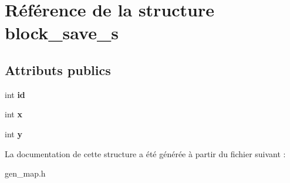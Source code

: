 \hypertarget{structblock__save__s}{}\section{Référence de la structure block\+\_\+save\+\_\+s}
\label{structblock__save__s}
\subsection*{Attributs publics}
\begin{DoxyCompactItemize}
\item 
\mbox{\label{structblock__save__s_a9ddd339ed05a3c19572de80652346574}} 
int {\bfseries id}
\item 
\mbox{\label{structblock__save__s_a7a1eed494972ef434cd36bdeb30ceee7}} 
int {\bfseries x}
\item 
\mbox{\label{structblock__save__s_a6ca3fee0efa427bc4504b65d28d8e8c9}} 
int {\bfseries y}
\end{DoxyCompactItemize}


La documentation de cette structure a été générée à partir du fichier suivant \+:\begin{DoxyCompactItemize}
\item 
gen\+\_\+map.\+h\end{DoxyCompactItemize}
